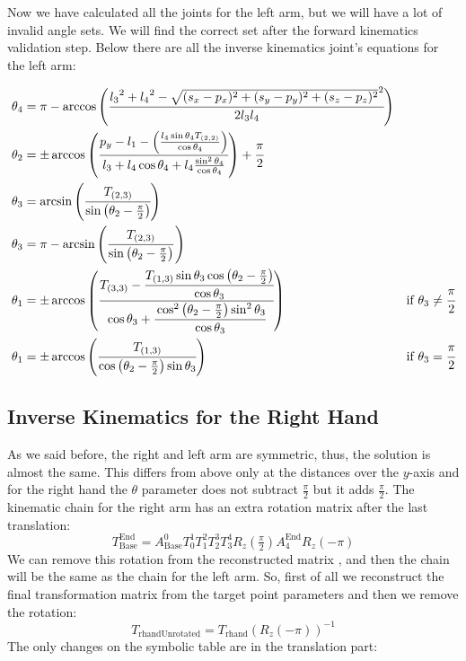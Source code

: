 Now we have calculated all the joints for the left arm, but we will have a lot of invalid angle sets. We will find the correct set after the forward kinematics validation step. Below there are all the inverse kinematics joint's equations for the left arm:

\begin{small}
\begin{align*}
\theta_4 &= \pi - \arccos\left(\cfrac{{l_3}^2 + {l_4}^2 - \sqrt{(s_x-p_x)^2 + (s_y-p_y)^2 + (s_z-p_z)^2}^2 }{2 l_3 l_4}\right)\\
\theta_2 &= \pm\arccos\left(\cfrac{p_y - l_1 - \left(\frac{l_4\sin\theta_4 T_{(2,2)}}{\cos\theta_4}\right)}{l_3 +l_4\cos\theta_4 + l_4\frac{\sin^2\theta_4}{\cos\theta_4}}\right)+\cfrac{\pi}{2}\\
\theta_3 &= \arcsin\left(\cfrac{T_{(2,3)}}{\sin\left(\theta_2-\frac{\pi}{2}\right)}\right)\\
\theta_3 &= \pi - \arcsin\left(\frac{T_{(2,3)}}{\sin\left(\theta_2-\frac{\pi}{2}\right)}\right)\\
\theta_1 &= \pm\arccos\left(\cfrac{T_{(3,3)} - \cfrac{T_{(1,3)}\sin\theta_3\cos\left(\theta_2 - \frac{\pi}{2}\right)}{\cos\theta_3}}{\cos\theta_3 + \cfrac{\cos^2\left(\theta_2-\frac{\pi}{2}\right)\sin^2\theta_3}{\cos\theta_3}}\right) &\text{if } \theta_3 \neq \cfrac{\pi}{2}\\
\theta_1 &= \pm\arccos\left(\cfrac{T_{(1,3)}}{\cos\left(\theta_2 - \frac{\pi}{2}\right)\sin\theta_3}\right) &\text{if } \theta_3 = \cfrac{\pi}{2}
\end{align*}
\end{small}

\subsection{Inverse Kinematics for the Right Hand}
As we said before, the right and left arm are symmetric, thus, the solution is almost the same. This differs from above only at the distances over the \(y\)-axis and for the right hand the \(\theta\) parameter does not subtract $\frac{\pi}{2}$ but it adds $\frac{\pi}{2}$. The kinematic chain for the right arm has an extra rotation matrix after the last translation:
\[
T^\text{End}_\text{Base} = A^0_\text{Base}T^1_0T^2_1T^3_2T^4_3R_z(\tfrac{\pi}{2})A^\text{End}_{4}R_z(-\pi)
\]
We can remove this rotation from the reconstructed matrix , and then the chain will be the same as the chain for the left arm. So, first of all we reconstruct the final transformation matrix from the target point parameters and then we remove the rotation:
\[
T_\text{rhandUnrotated} = T_\text{rhand}{\left(R_z(-\pi)\right)}^{-1}
\]
The only changes on the symbolic table are in the translation part:


